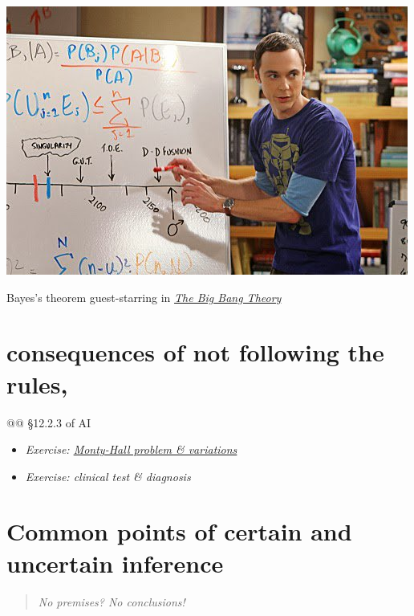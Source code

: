 \documentclass[
  a4paper,
  DIV=11,
  numbers=noendperiod,
  oneside]{scrreprt}
\begin{document}
\begin{marginfigure}

{\centering \includegraphics{bayes_big-bang.jpg}

}

\caption{Bayes's theorem guest-starring in
\href{https://www.imdb.com/title/tt0898266/}{\emph{The Big Bang
Theory}}}

\end{marginfigure}

\hypertarget{consequences-of-not-following-the-rules}{%
\section{consequences of not following the
rules,}\label{consequences-of-not-following-the-rules}}

@@ §12.2.3 of AI

\begin{itemize}
\item
  \emph{Exercise: \href{The_Monty_Hall_problem-exercise.pdf}{Monty-Hall
  problem \& variations}}
\item
  \emph{Exercise: clinical test \& diagnosis}
\end{itemize}

\hypertarget{common-points-of-certain-and-uncertain-inference}{%
\section{Common points of certain and uncertain
inference}\label{common-points-of-certain-and-uncertain-inference}}

\begin{quote}
\emph{No premises? No conclusions!}
\end{quote}
\end{document}
